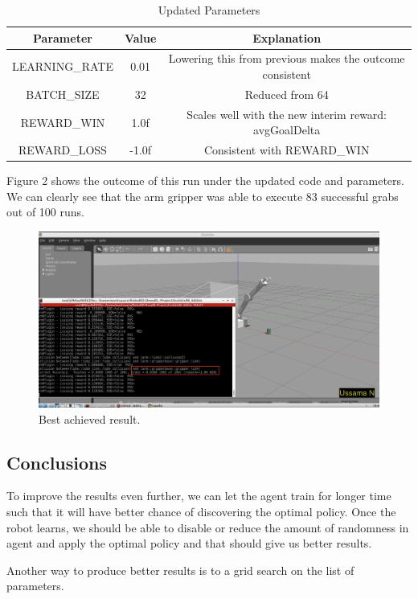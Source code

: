 \documentclass{article}
\begin{document}
\begin{table}[ht]
\caption{Updated Parameters}
\label{updated_params}
\begin{center}
\begin{tabular}{|c||c||c|}
\hline
Parameter & Value & Explanation\\
\hline
LEARNING\_RATE & 0.01 & Lowering this from previous makes the outcome consistent \\
\hline
BATCH\_SIZE & 32 & Reduced from 64 \\
\hline
REWARD\_WIN  & 1.0f & Scales well with the new interim reward: avgGoalDelta \\
\hline
REWARD\_LOSS & -1.0f & Consistent with REWARD\_WIN \\
\hline
\end{tabular}
\end{center}
\end{table}

Figure 2 shows the outcome of this run under the updated code and parameters. We can clearly see that the arm gripper was able to execute 83 successful grabs out of 100 runs.

\begin{figure}[!thpb]
      \centering
      \includegraphics[width=\linewidth]{final-result.png}
      \caption{Best achieved result.}
      \label{fig:robot2}
\end{figure}

\subsection{Conclusions}
To improve the results even further, we can let the agent train for longer time such that it will have better chance of discovering the optimal policy. Once the robot learns, we should be able to disable or reduce the amount of randomness in agent and apply the optimal policy and that should give us better results.

Another way to produce better results is to a grid search on the list of parameters.
\end{document}
